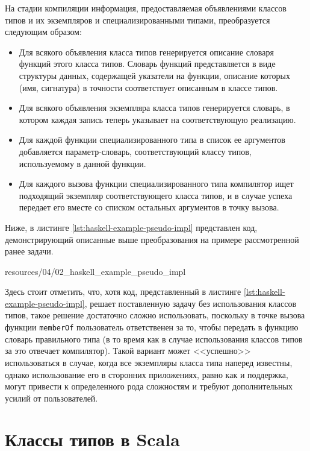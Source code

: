 На стадии компиляции информация, предоставляемая объявлениями классов типов и их экземпляров и специализированными типами, преобразуется следующим образом:
\begin{itemize}
    \item Для всякого объявления класса типов генерируется описание словаря функций этого класса типов. Словарь функций представляется в виде структуры данных, содержащей указатели на функции, описание которых (имя, сигнатура) в точности соответствует описанным в классе типов. 
    \item Для всякого объявления экземпляра класса типов генерируется словарь, в котором каждая запись теперь указывает на соответствующую реализацию. 
    \item Для каждой функции специализированного типа в список ее аргументов добавляется параметр-словарь, соответствующий классу типов, используемому в данной функции.
    \item Для каждого вызова функции специализированного типа компилятор ищет подходящий экземпляр соответствующего класса типов, и  в случае успеха передает его вместе со списком остальных аргументов в точку вызова. 
\end{itemize}
Ниже, в листинге \ref{lst:haskell-example-pseudo-impl} представлен код, демонстрирующий описанные выше преобразования на примере рассмотренной ранее задачи. 


{resources/04/02_haskell_example_pseudo_impl}

Здесь стоит отметить, что, хотя код, представленный в листинге \ref{lst:haskell-example-pseudo-impl}, решает поставленную задачу без использования классов типов, такое решение достаточно сложно использовать, поскольку в точке вызова функции \lstinline{memberOf} пользователь ответственен за то, чтобы передать в функцию словарь правильного типа (в то время как в случае использования классов типов за это отвечает компилятор). Такой вариант может <<успешно>> использоваться в случае, когда все экземпляры класса типа наперед известны, однако использование его в сторонних приложениях, равно как и поддержка, могут привести к определенного рода сложностям и требуют дополнительных усилий от пользователей.

\section{Классы типов в Scala}

